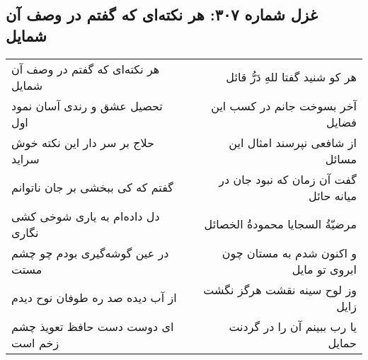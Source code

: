 \begin{center}
\section*{غزل شماره ۳۰۷: هر نکته‌ای که گفتم در وصف آن شمایل}
\label{sec:sh307}
\begin{longtable}{l p{0.5cm} r}
هر نکته‌ای که گفتم در وصف آن شمایل
&&
هر کو شنید گفتا للهِ دَرُّ قائل
\\
تحصیل عشق و رندی آسان نمود اول
&&
آخر بسوخت جانم در کسب این فضایل
\\
حلاج بر سر دار این نکته خوش سراید
&&
از شافعی نپرسند امثال این مسائل
\\
گفتم که کی ببخشی بر جان ناتوانم
&&
گفت آن زمان که نبود جان در میانه حائل
\\
دل داده‌ام به یاری شوخی کشی نگاری
&&
مرضیّةُ السجایا محمودةُ الخصائل
\\
در عین گوشه‌گیری بودم چو چشم مستت
&&
و اکنون شدم به مستان چون ابروی تو مایل
\\
از آب دیده صد ره طوفان نوح دیدم
&&
وز لوح سینه نقشت هرگز نگشت زایل
\\
ای دوست دست حافظ تعویذ چشم زخم است
&&
یا رب ببینم آن را در گردنت حمایل
\\
\end{longtable}
\end{center}
